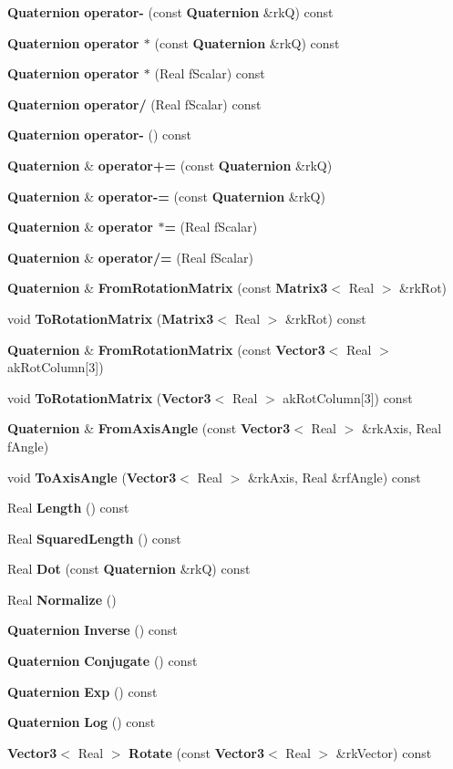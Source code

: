 \begin{CompactItemize}
\item 
{\bf Quaternion} {\bf operator-} (const {\bf Quaternion} \&rk\-Q) const
\item 
{\bf Quaternion} {\bf operator $\ast$} (const {\bf Quaternion} \&rk\-Q) const
\item 
{\bf Quaternion} {\bf operator $\ast$} (Real f\-Scalar) const 
\item 
{\bf Quaternion} {\bf operator/} (Real f\-Scalar) const 
\item 
{\bf Quaternion} {\bf operator-} () const
\item 
{\bf Quaternion} \& {\bf operator+=} (const {\bf Quaternion} \&rk\-Q)
\item 
{\bf Quaternion} \& {\bf operator-=} (const {\bf Quaternion} \&rk\-Q)
\item 
{\bf Quaternion} \& {\bf operator $\ast$=} (Real f\-Scalar)
\item 
{\bf Quaternion} \& {\bf operator/=} (Real f\-Scalar)
\item 
{\bf Quaternion} \& {\bf From\-Rotation\-Matrix} (const {\bf Matrix3}$<$ Real $>$ \&rk\-Rot)
\item 
void {\bf To\-Rotation\-Matrix} ({\bf Matrix3}$<$ Real $>$ \&rk\-Rot) const
\item 
{\bf Quaternion} \& {\bf From\-Rotation\-Matrix} (const {\bf Vector3}$<$ Real $>$ ak\-Rot\-Column[3])
\item 
void {\bf To\-Rotation\-Matrix} ({\bf Vector3}$<$ Real $>$ ak\-Rot\-Column[3]) const
\item 
{\bf Quaternion} \& {\bf From\-Axis\-Angle} (const {\bf Vector3}$<$ Real $>$ \&rk\-Axis, Real f\-Angle)
\item 
void {\bf To\-Axis\-Angle} ({\bf Vector3}$<$ Real $>$ \&rk\-Axis, Real \&rf\-Angle) const
\item 
Real {\bf Length} () const
\item 
Real {\bf Squared\-Length} () const
\item 
Real {\bf Dot} (const {\bf Quaternion} \&rk\-Q) const
\item 
Real {\bf Normalize} ()
\item 
{\bf Quaternion} {\bf Inverse} () const
\item 
{\bf Quaternion} {\bf Conjugate} () const
\item 
{\bf Quaternion} {\bf Exp} () const
\item 
{\bf Quaternion} {\bf Log} () const
\item 
{\bf Vector3}$<$ Real $>$ {\bf Rotate} (const {\bf Vector3}$<$ Real $>$ \&rk\-Vector) const

\end{CompactItemize}
